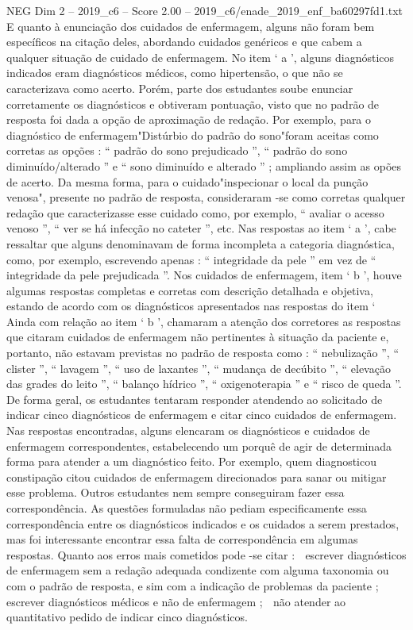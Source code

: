 \begin{textsample}{NEG Dim 2 – 2019\_c6 – Score 2.00 – 2019\_c6/enade\_2019\_enf\_ba60297fd1.txt}
E quanto à enunciação dos cuidados de enfermagem, alguns não foram bem específicos na citação deles, abordando cuidados genéricos e que cabem a qualquer situação de cuidado de enfermagem.
No item ‘ a ’, alguns diagnósticos indicados eram diagnósticos médicos, como hipertensão, o que não se caracterizava como acerto.
Porém, parte dos estudantes soube enunciar corretamente os diagnósticos e obtiveram pontuação, visto que no padrão de resposta foi dada a opção de aproximação de redação.
Por exemplo, para o diagnóstico de enfermagem"Distúrbio do padrão do sono"foram aceitas como corretas as opções : “ padrão do sono prejudicado ”, “ padrão do sono diminuído/alterado ” e “ sono diminuído e alterado ” ; ampliando assim as opões de acerto.
Da mesma forma, para o cuidado"inspecionar o local da punção venosa", presente no padrão de resposta, consideraram -se como corretas qualquer redação que caracterizasse esse cuidado como, por exemplo, “ avaliar o acesso venoso ”, “ ver se há infecção no cateter ”, etc.
Nas respostas ao item ‘ a ’, cabe ressaltar que alguns denominavam de forma incompleta a categoria diagnóstica, como, por exemplo, escrevendo apenas : “ integridade da pele ” em vez de “ integridade da pele prejudicada ”.
Nos cuidados de enfermagem, item ‘ b ’, houve algumas respostas completas e corretas com descrição detalhada e objetiva, estando de acordo com os diagnósticos apresentados nas respostas do item ‘ Ainda com relação ao item ‘ b ’, chamaram a atenção dos corretores as respostas que citaram cuidados de enfermagem não pertinentes à situação da paciente e, portanto, não estavam previstas no padrão de resposta como : “ nebulização ”, “ clister ”, “ lavagem ”, “ uso de laxantes ”, “ mudança de decúbito ”, “ elevação das grades do leito ”, “ balanço hídrico ”, “ oxigenoterapia ” e “ risco de queda ”.
De forma geral, os estudantes tentaram responder atendendo ao solicitado de indicar cinco diagnósticos de enfermagem e citar cinco cuidados de enfermagem.
Nas respostas encontradas, alguns elencaram os diagnósticos e cuidados de enfermagem correspondentes, estabelecendo um porquê de agir de determinada forma para atender a um diagnóstico feito.
Por exemplo, quem diagnosticou constipação citou cuidados de enfermagem direcionados para sanar ou mitigar esse problema.
Outros estudantes nem sempre conseguiram fazer essa correspondência.
As questões formuladas não pediam especificamente essa correspondência entre os diagnósticos indicados e os cuidados a serem prestados, mas foi interessante encontrar essa falta de correspondência em algumas respostas.
Quanto aos erros mais cometidos pode -se citar :  escrever diagnósticos de enfermagem sem a redação adequada condizente com alguma taxonomia ou com o padrão de resposta, e sim com a indicação de problemas da paciente ;  escrever diagnósticos médicos e não de enfermagem ;  não atender ao quantitativo pedido de indicar cinco diagnósticos.

\end{textsample}
